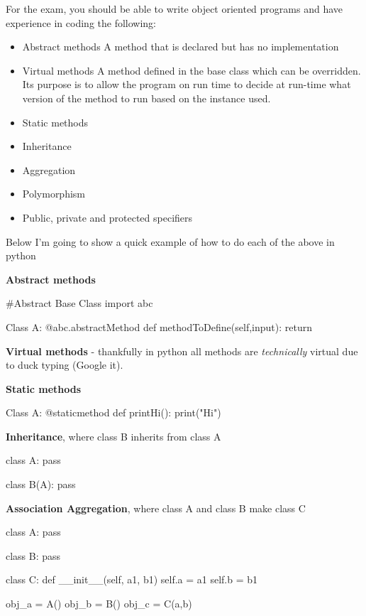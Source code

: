   	For the exam, you should be able to write object oriented programs and have experience in coding the following:
  	\begin{itemize}
  		\item Abstract methods
	  		\subitem A method that is declared but has no implementation
  		\item Virtual methods
	  		\subitem A method defined in the base class which can be overridden. Its purpose is to allow the program on run time to decide at run-time what version of the method to run based on the instance used.
  		\item Static methods
  		\item Inheritance
  		\item Aggregation
  		\item Polymorphism
  		\item Public, private and protected specifiers
  	\end{itemize}

  	Below I'm going to show a quick example of how to do each of the above in python

  	\textbf{Abstract methods}

  	\begin{python}
#Abstract Base Class
import abc

Class A:
	@abc.abstractMethod
	def methodToDefine(self,input):
		return\end{python}

	\textbf{Virtual methods} - thankfully in python all methods are \textit{technically} virtual due to duck typing (Google it).

	\textbf{Static methods}

\begin{python}
Class A:
	@staticmethod
	def printHi():
  		print("Hi")\end{python}

  	\textbf{Inheritance}, where class B inherits from class A

\begin{python}
class A:
	pass

class B(A):
	pass
\end{python}

	\textbf{Association Aggregation}, where class A and class B make class C

\begin{python}
class A:
	pass

class B:
	pass

class C:
	def __init__(self, a1, b1)
		self.a = a1
		self.b = b1

obj_a = A()
obj_b = B()
obj_c = C(a,b)
\end{python}

